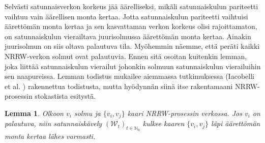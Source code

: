 \documentclass[finnish, 12pt, a4paper, sci, utf8, pdfa]{aaltothesis}
\newcommand{\N}{\mathbb{N}}
\newcommand{\Wrandom}{\mathcal{W}}
\newtheorem{lemma}{Lemma}
\begin{document}
Selvästi satunnaisverkon korkeus jää äärelliseksi, mikäli satunnaiskulun pariteetti vaihtuu vain äärellisen monta kertaa. Jotta satunnaiskulun pariteetti vaihtuisi äärettömän monta kertaa
ja sen kasvattaman verkon korkeus olisi rajoittamaton, on satunnaiskulun vierailtava juurisolmussa äärettömän monta kertaa. Ainakin juurisolmun on siis oltava palautuva tila. Myöhemmin
näemme, että peräti kaikki NRRW-verkon solmut ovat palautuvia. Ennen sitä osoitan kuitenkin lemman, joka liittää satunnaiskulun vierailut johonkin solmuun satunnaiskulun vierailuihin sen
naapureissa. Lemman todistus mukailee aiemmassa tutkimuksessa (Iacobelli et al. \cite{Iacobelli}) rakennettua todistusta, mutta hyödynnän siinä itse rakentamaani NRRW-prosessin stokastista
esitystä.

\begin{lemma}
Olkoon $ v_{i} $ solmu ja $ \{v_{i}, v_{j}\} $ kaari NRRW-prosessin verkossa. Jos $ v_{i} $ on palautuva, niin satunnaiskävely $ (\Wrandom_{t})_{t \in \N_{0}} $ kulkee kaaren $ \{v_{i}, v_{j}\} $ läpi äärettömän monta kertaa lähes varmasti.
\end{lemma}
\end{document}
